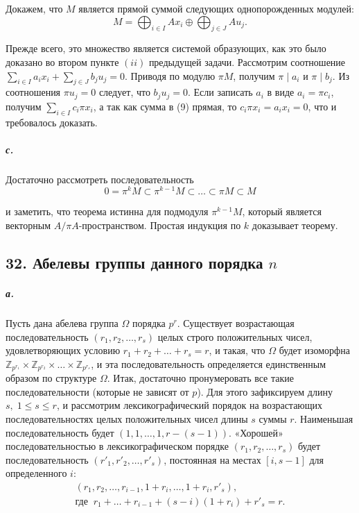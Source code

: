 {Докажем, что $M$ является прямой суммой следующих однопорожденных модулей:
\begin{equation*}
M = \bigoplus_{i \in I} Ax_{i} \oplus \bigoplus_{j \in J} Au_{j}.
\end{equation*}




\noindent Прежде всего, это множество является системой образующих, как это
было доказано во втором пункте $(ii)$ предыдущей задачи. Рассмотрим
соотношение $\sum_{i \in I}a_{i}x_{i} + \sum_{j \in J}b_{j}u_{j} = 0$. Приводя по модулю $\pi M$, получим $\pi\;|\;a_{i}$ и $\pi\;|\;b_{j}$. Из соотношения $\pi u_{j} = 0$ следует, что $b_{j}u_{j} = 0$. Если
записать $a_{i}$ в виде $a_{i} = \pi c_{i}$, получим $\sum_{i \in I} c_{i}\pi x_{i}$, а так как сумма
в (9) прямая, то $c_{i}\pi x_{i} = a_{i}x_{i} = 0$, что и требовалось доказать.

\subparagraph{с.} Достаточно рассмотреть последовательность
\begin{equation*}
0 = \pi^{k}M \subset \pi^{k-1}M \subset\dots\subset \pi M \subset M
\end{equation*}

\noindent и заметить, что теорема истинна для подмодуля $\pi^{k-1}M$, который является векторным $A/\pi A$-пространством. Простая индукция по $k$ доказывает теорему.

\subsection{\normalsize{32. Абелевы группы данного порядка $n$}}

\subparagraph{а.} Пусть дана абелева группа $\Omega$ порядка $p^{r}$. Существует возрастающая последовательность $(r_{1},r_{2},\ldots,r_{s})$ целых строго положительных
чисел, удовлетворяющих условию $r_{1} + r_{2} +\dots+ r_{s} = r$, и такая, что
$\Omega$ будет изоморфна $\mathbb {Z}_{p^{r_{1}}} \times \mathbb {Z}_{p^{r_{2}}} \times \dots \times \mathbb {Z}_{p^{r_{s}}}$, и эта последовательность
определяется единственным образом по структуре $\Omega$. Итак, достаточно пронумеровать все такие последовательности (которые не зависят
от $p$). Для этого зафиксируем длину $s,\; 1 \leqslant s \leqslant r$, и рассмотрим лексикографический порядок на возрастающих последовательностях целых
положительных чисел длины $s$ суммы $r$. Наименьшая последовательность будет $(1,1,\ldots,1,r - (s - 1))$. «Хорошей» последовательностью в
лексикографическом порядке $(r_{1},r_{2},\ldots,r_{s})$ будет последовательность
$(r'_{1},r'_{2},\ldots,r'_{s})$, постоянная на местах $[i,s - 1]$ для определенного $i$:
\begin{gather}
(r_{1},r_{2},\ldots,r_{i-1},1 + r_{i},\ldots,1 + r_{i},r'_{s}), \nonumber \\
\text{где}\;\;r_{1} +\dots+ r_{i-1} + (s-i)(1 + r_{i}) + r'_{s} = r.
\end{gather}

}
